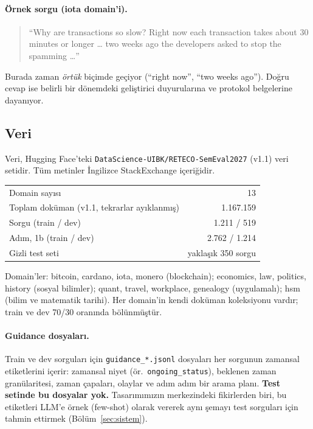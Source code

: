 \documentclass[11pt,a4paper]{article}
\begin{document}
\paragraph{Örnek sorgu (iota domain'i).}
\begin{quote}\small
``Why are transactions so slow? Right now each transaction takes about 30 minutes or longer
\ldots{} two weeks ago the developers asked to stop the spamming \ldots''
\end{quote}
Burada zaman \emph{örtük} biçimde geçiyor (``right now'', ``two weeks ago''). Doğru cevap ise
belirli bir dönemdeki geliştirici duyurularına ve protokol belgelerine dayanıyor.

\subsection{Veri}
Veri, Hugging Face'teki \texttt{DataScience-UIBK/RETECO-SemEval2027} (v1.1) veri setidir.
Tüm metinler İngilizce StackExchange içeriğidir.

\begin{center}
\begin{tabular}{lr}
\toprule
Domain sayısı & 13 \\
Toplam doküman (v1.1, tekrarlar ayıklanmış) & 1.167.159 \\
Sorgu (train / dev) & 1.211 / 519 \\
Adım, 1b (train / dev) & 2.762 / 1.214 \\
Gizli test seti & yaklaşık 350 sorgu \\
\bottomrule
\end{tabular}
\end{center}

\noindent Domain'ler: bitcoin, cardano, iota, monero (blockchain); economics, law, politics,
history (sosyal bilimler); quant, travel, workplace, genealogy (uygulamalı); hsm (bilim ve
matematik tarihi). Her domain'in kendi doküman koleksiyonu vardır; train ve dev 70/30 oranında
bölünmüştür.

\paragraph{Guidance dosyaları.}
Train ve dev sorguları için \texttt{guidance\_*.jsonl} dosyaları her sorgunun zamansal
etiketlerini içerir: zamansal niyet (ör.\ \texttt{ongoing\_status}), beklenen zaman
granülaritesi, zaman çapaları, olaylar ve adım adım bir arama planı. \textbf{Test setinde bu
dosyalar yok.} Tasarımımızın merkezindeki fikirlerden biri, bu etiketleri LLM'e örnek
(few-shot) olarak vererek aynı şemayı test sorguları için tahmin ettirmek
(Bölüm~\ref{sec:sistem}).
\end{document}
